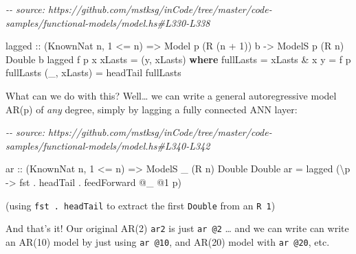 \documentclass[]{article}
\newenvironment{Shaded}{}{}
\newcommand{\CommentTok}[1]{\textcolor[rgb]{0.38,0.63,0.69}{\textit{#1}}}
\newcommand{\DataTypeTok}[1]{\textcolor[rgb]{0.56,0.13,0.00}{#1}}
\newcommand{\DecValTok}[1]{\textcolor[rgb]{0.25,0.63,0.44}{#1}}
\newcommand{\FunctionTok}[1]{\textcolor[rgb]{0.02,0.16,0.49}{#1}}
\newcommand{\KeywordTok}[1]{\textcolor[rgb]{0.00,0.44,0.13}{\textbf{#1}}}
\newcommand{\NormalTok}[1]{#1}
\newcommand{\OperatorTok}[1]{\textcolor[rgb]{0.40,0.40,0.40}{#1}}
\newcommand{\OtherTok}[1]{\textcolor[rgb]{0.00,0.44,0.13}{#1}}
\begin{document}
\begin{Shaded}
\begin{Highlighting}[]
\CommentTok{{-}{-} source: https://github.com/mstksg/inCode/tree/master/code{-}samples/functional{-}models/model.hs\#L330{-}L338}

\NormalTok{lagged}
\OtherTok{    ::}\NormalTok{ (}\DataTypeTok{KnownNat}\NormalTok{ n, }\DecValTok{1} \OperatorTok{\textless{}=}\NormalTok{ n)}
    \OtherTok{=\textgreater{}} \DataTypeTok{Model}\NormalTok{  p       (}\DataTypeTok{R}\NormalTok{ (n }\OperatorTok{+} \DecValTok{1}\NormalTok{)) b}
    \OtherTok{{-}\textgreater{}} \DataTypeTok{ModelS}\NormalTok{ p (}\DataTypeTok{R}\NormalTok{ n) }\DataTypeTok{Double}\NormalTok{      b}
\NormalTok{lagged f p x xLasts }\OtherTok{=}\NormalTok{ (y, xLasts\textquotesingle{})}
  \KeywordTok{where}
\NormalTok{    fullLasts    }\OtherTok{=}\NormalTok{ xLasts }\OperatorTok{\&}\NormalTok{ x}
\NormalTok{    y            }\OtherTok{=}\NormalTok{ f p fullLasts}
\NormalTok{    (\_, xLasts\textquotesingle{}) }\OtherTok{=}\NormalTok{ headTail fullLasts}
\end{Highlighting}
\end{Shaded}

What can we do with this? Well\ldots{} we can write a general autoregressive
model AR(p) of \emph{any} degree, simply by lagging a fully connected ANN layer:

\begin{Shaded}
\begin{Highlighting}[]
\CommentTok{{-}{-} source: https://github.com/mstksg/inCode/tree/master/code{-}samples/functional{-}models/model.hs\#L340{-}L342}

\OtherTok{ar ::}\NormalTok{ (}\DataTypeTok{KnownNat}\NormalTok{ n, }\DecValTok{1} \OperatorTok{\textless{}=}\NormalTok{ n)}
   \OtherTok{=\textgreater{}} \DataTypeTok{ModelS}\NormalTok{ \_ (}\DataTypeTok{R}\NormalTok{ n) }\DataTypeTok{Double} \DataTypeTok{Double}
\NormalTok{ar }\OtherTok{=}\NormalTok{ lagged (\textbackslash{}p }\OtherTok{{-}\textgreater{}} \FunctionTok{fst} \OperatorTok{.}\NormalTok{ headTail }\OperatorTok{.}\NormalTok{ feedForward }\OperatorTok{@}\NormalTok{\_ }\OperatorTok{@}\DecValTok{1}\NormalTok{ p)}
\end{Highlighting}
\end{Shaded}

(using \texttt{fst\ .\ headTail} to extract the first \texttt{Double} from an
\texttt{R\ 1})

And that's it! Our original AR(2) \texttt{ar2} is just \texttt{ar\ @2} \ldots{}
and we can write can write an AR(10) model by just using \texttt{ar\ @10}, and
AR(20) model with \texttt{ar\ @20}, etc.
\end{document}

